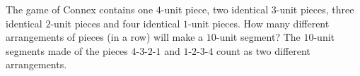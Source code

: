 The game of Connex contains one $4$-unit piece, two identical $3$-unit pieces, three identical $2$-unit pieces and four identical $1$-unit pieces. How many different arrangements of pieces (in a row) will make a $10$-unit segment? The $10$-unit segments made of the pieces $4$-$3$-$2$-$1$ and $1$-$2$-$3$-$4$ count as two different arrangements.
